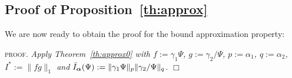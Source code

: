 \documentclass[reqno,oneside,letterpaper,10pt]{article}
\newcommand{\f}{f}
\newcommand{\g}{g}
\newcommand{\q}{q}
\def\p{p}
\newenvironment{proof}{\textsc{proof.}\it}{\hfill{$\Box$}}
\newtheorem{theorem}{Theorem}
\begin{document}
%
%
%
%
%


\subsection*{Proof of Proposition~\ref{th:approx}}
We are now ready to obtain the proof for the bound approximation property:

\begin{proof}
Apply Theorem~\ref{th:approx0} with $f:=\gamma_1\Psi$, $\g:=\gamma_2/\Psi$, $\p:=\alpha_1$, $\q:=\alpha_2$, $I^*:=\|\f\g\|_1$ and $\bar I_\balpha (\Psi):= \|\gamma_1\Psi\|_\p\|\gamma_2/\Psi\|_\q$.
\end{proof}







\end{document}
